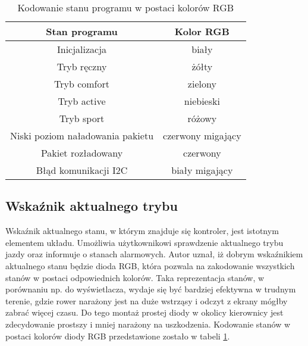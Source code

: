 \begin{table}[h]
    \caption{Kodowanie stanu programu w postaci kolorów RGB}
    \begin{center}
		\label{tab:rgb}
		\begin{tabular}{|c|c|}
			\hline
 			\textbf{Stan programu} & \textbf{Kolor RGB}\\
 			\hline
 			Inicjalizacja & biały\\  
 			\hline
			Tryb ręczny & żółty\\
			\hline
			Tryb comfort & zielony \\  
			\hline
			Tryb active & niebieski\\  
			\hline
			Tryb sport & różowy \\  
			\hline
			Niski poziom naładowania pakietu & czerwony migający\\  
			\hline
			Pakiet rozładowany & czerwony \\  
			\hline
			Błąd komunikacji I2C & biały migający\\  
			\hline
		\end{tabular}
	\end{center}
\end{table}
\subsection{Wskaźnik aktualnego trybu}

Wskaźnik aktualnego stanu, w którym znajduje się kontroler, jest istotnym elementem układu. Umożliwia  użytkownikowi sprawdzenie aktualnego trybu jazdy oraz informuje o stanach alarmowych. Autor uznał, iż dobrym wskaźnikiem aktualnego stanu będzie dioda RGB, która pozwala na zakodowanie wszystkich stanów w postaci odpowiednich kolorów. Taka reprezentacja stanów, w porównaniu np. do wyświetlacza, wydaje się być bardziej efektywna w trudnym terenie, gdzie rower narażony jest na duże wstrząsy i odczyt z ekrany mógłby zabrać więcej czasu. Do tego montaż prostej diody w okolicy kierownicy jest zdecydowanie prostszy i mniej narażony na uszkodzenia.
Kodowanie stanów w postaci kolorów diody RGB przedstawione zostało w tabeli \ref{tab:rgb}.



















